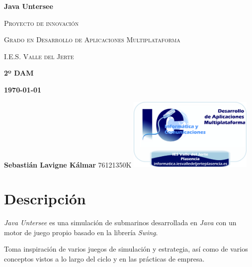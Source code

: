\documentclass[a4paper,
	11pt,
	parskip=full,
	bibliography=totoc,
	twoside
	]{scrartcl}
\let\oldsection\section
\def\section{\cleardoubleoddpage\oldsection}
\begin{document}
%

\cleardoubleoddpage
\begin{titlepage}
	{\space}
	\vspace{5cm}
	\centering
	{\rmfamily\bfseries\Huge Java Untersee\par}
	\vspace{1.5cm}
	{\rmfamily\scshape\LARGE Proyecto de innovación\par}
	\vspace{1.5cm}
	{\rmfamily\scshape\LARGE Grado en Desarrollo de Aplicaciones Multiplataforma \par}
	\vspace{0.2cm}
	{\rmfamily\scshape\Huge I.E.S. Valle del Jerte \par}
	\vspace{1cm}
	\raggedleft
	\vfill
	{\rmfamily\bfseries\large 2º DAM\linebreak}
	{\rmfamily\bfseries\large\today\par}
	\vspace{1cm}
	{\rmfamily\bfseries\Large Sebastián Lavigne Kálmar\linebreak}
	{76121350K}
	\vfill
	\includegraphics[width=6cm]{img/DAM_iesvallejerteplasencia.png}
	
	
	
\end{titlepage}

\cleardoubleoddpage
\tableofcontents

\doublespacing

\cleardoubleoddpage
\section{Descripción}
\label{sec:descripcion}
	\textit{Java Untersee} es una simulación de submarinos desarrollada en \textit{Java} con un motor de juego propio basado en la librería \textit{Swing}.
	
	Toma inspiración de varios juegos de simulación y estrategia, así como de varios conceptos vistos a lo largo del ciclo y en las prácticas de empresa.
	
\end{document}
